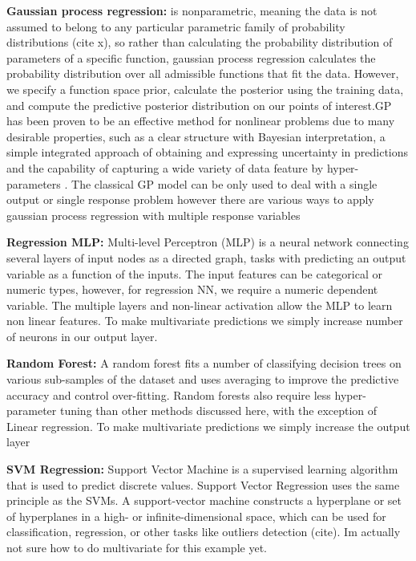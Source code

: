 \documentclass[journal,twoside,web]{ieeecolor}
\begin{document}
\textbf{Gaussian process regression: } is nonparametric, meaning the data is not assumed to belong to any particular parametric family of probability distributions (cite x), so rather than calculating the probability distribution of parameters of a specific function, gaussian process regression calculates the probability distribution over all admissible functions that fit the data. However, we specify a function space prior, calculate the posterior using the training data, and compute the predictive posterior distribution on our points of interest.GP has been proven to be an effective method for
nonlinear problems due to many desirable properties, such as a clear structure with Bayesian interpretation,
a simple integrated approach of obtaining and expressing uncertainty in predictions and the capability of
capturing a wide variety of data feature by hyper-parameters \cite{Zhao2009}. 
The classical GP model can be only used to deal with a single output or single response problem however there are various ways to apply gaussian process regression with multiple response variables \cite{Zhao2009}

\textbf{Regression MLP: } Multi-level Perceptron (MLP) is a neural network connecting several layers of input nodes as a directed graph, tasks with predicting an output variable as a function of the inputs. The input features can be categorical or numeric types, however, for regression NN, we require a numeric dependent variable. The multiple layers and non-linear activation allow the MLP to learn non linear features. To make multivariate predictions we simply increase number of neurons in our output layer. 


\textbf{Random Forest: } A random forest fits a number of classifying decision trees on various sub-samples of the dataset and uses averaging to improve the predictive accuracy and control over-fitting. Random forests also require less hyper-parameter tuning than other methods discussed here, with the exception of Linear regression.  To make multivariate predictions we simply increase the output layer

\textbf{SVM Regression: } Support Vector Machine is a supervised learning algorithm that is used to predict discrete values. Support Vector Regression uses the same principle as the SVMs. A support-vector machine constructs a hyperplane or set of hyperplanes in a high- or infinite-dimensional space, which can be used for classification, regression, or other tasks like outliers detection (cite). Im actually not sure how to do multivariate for this example yet. 
\end{document}
